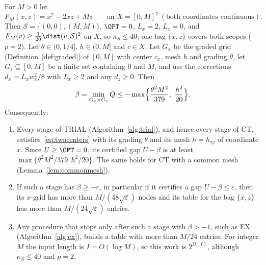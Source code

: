 \begin{proposition}
\label{prop:twocenters}
For $M>0$ let
\[
F_M(x,z)=x^2-2xz+Mz\qquad\text{on }X=[0,M]^2\ (\text{both coordinates
continuous}).
\]
Then $\mathcal S=\{(0,0),(M,M)\}$, $\OPT=0$, $L_x=2$, $L_z=0$, and
$F_M(v)\ge\frac1{20}\dist(v,\mathcal S)^2$ on $X$, so $\kappa_S\le40$; one bag
$\{x,z\}$ covers both scopes ($p=2$). Let $\theta\in(0,1/4]$, $h\in(0,M]$ and
$c\in X$. Let $G_x$ be the graded grid (Definition~\ref{def:graded}) of
$[0,M]$ with center $c_x$, mesh $h$ and grading $\theta$, let $G_z\subseteq[0,M]$ be a finite set containing $0$
and $M$, and use the corrections $d_x=L_xw_x^2/8$ with $L_x\ge2$ and any
$d_z\ge0$. Then
\begin{equation}\label{eq:twocenters}
\beta=\min_{G_x\times G_z}Q\le-\max\Bigl\{\frac{\theta^2M^2}{379},\
\frac{h^2}{20}\Bigr\}.
\end{equation}
Consequently:
\begin{enumerate}[label=(\alph*)]
\item Every stage of TRIAL (Algorithm~\ref{alg:trial}), and hence every stage
of CT, satisfies~\eqref{eq:twocenters} with its grading $\theta$ and its mesh
$h=h_{xj}$ of coordinate $x$. Since $U\ge\OPT=0$, its certified gap $U-\beta$
is at least $\max\{\theta^2M^2/379,h^2/20\}$. The same holds for CT with a
common mesh (Lemma~\ref{lem:commonmesh}).
\item If such a stage has $\beta\ge-\varepsilon$, in particular if it
certifies a gap $U-\beta\le\varepsilon$, then its $x$-grid has more than
$M/(48\sqrt\varepsilon)$ nodes and its table for the bag $\{x,z\}$ has more
than $M/(24\sqrt\varepsilon)$ entries.
\item Any procedure that stops only after such a stage with $\beta>-1$, such
as EX (Algorithm~\ref{alg:ex}), builds a table with more than $M/24$ entries.
For integer $M$ the input length is $I=O(\log M)$, so this work is
$2^{\Omega(I)}$, although $\kappa_S\le40$ and $p=2$.
\end{enumerate}
\end{proposition}

